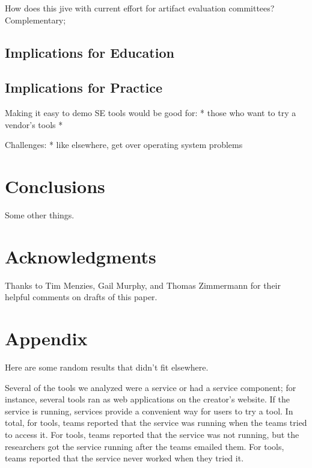 \documentclass[10pt,conference]{IEEEtran}
\begin{document}
How does this jive with current effort for artifact
evaluation committees?
Complementary; 

\subsection{Implications for Education}

\subsection{Implications for Practice}

Making it easy to demo SE tools would be good for:
* those who want to try a vendor's tools
*  

Challenges:
* like elsewhere, get over operating system problems

\section{Conclusions}

Some other things.

\section*{Acknowledgments}

Thanks to Tim Menzies, Gail Murphy, and Thomas Zimmermann
for their helpful comments on drafts of this paper.  





\section{Appendix}

Here are some random results that didn't fit elsewhere.

Several of the tools we analyzed were a service or had a
service component; for instance, several tools
ran as web applications on the creator's website.
If the service is running, services provide a convenient way
for users to try a tool.
In total, for \serviceRunning tools, teams 
reported that the service was running when the teams tried
to access it.
For \serviceRunningLater tools, teams reported that the service
was not running, but the researchers got the service running
after the teams emailed them.
For \serviceRunningNever tools, teams reported that the service
never worked when they tried it.  
\end{document}
